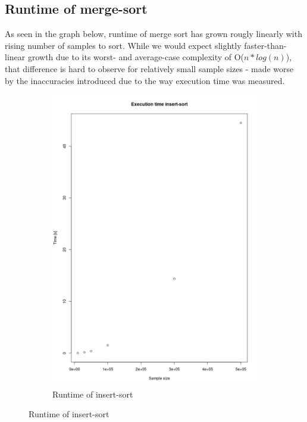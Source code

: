\documentclass[a4paper]{scrartcl}
\begin{document}
\subsection*{Runtime of merge-sort}

As seen in the graph below, runtime of merge sort has grown rougly linearly
with rising number of samples to sort. While we would expect slightly
faster-than-linear growth due to its worst- and average-case complexity of O($n
* log(n)$), that difference is hard to observe for relatively small sample
sizes - made worse by the inaccuracies introduced due to the way execution time
was measured.

\begin{figure}
    \centering
    \begin{subfigure}{.5\textwidth}
      \centering
      \caption{Runtime of insert-sort}
      \includegraphics[width=\linewidth]{resources/insert_sort.png}

\end{subfigure}
\end{figure}
\end{document}
